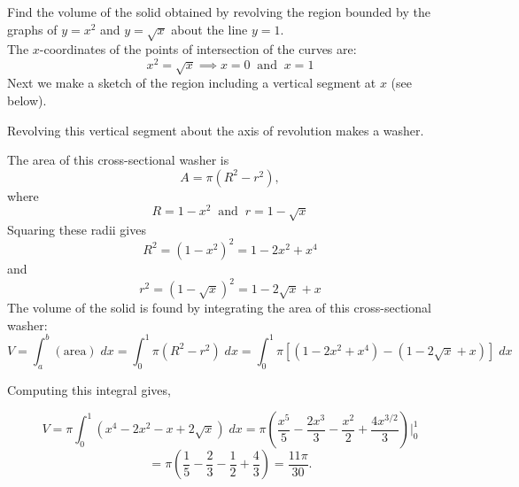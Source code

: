 \documentclass[handout]{ximera}
\begin{document}
\begin{example}[example 6] Find the volume of the solid obtained by revolving the region bounded by the graphs of 
$y = x^2$ and $y = \sqrt x$ about the line $y = 1$.\\
The $x$-coordinates of the points of intersection of the curves are:
\[
x^2 = \sqrt x \implies x = 0 \;\; \text{and} \;\; x=1\]
Next we make a sketch of the region including a vertical segment at $x$ (see below).

Revolving this vertical segment about the axis of revolution makes a washer.

The area of this cross-sectional washer is
\[
A = \pi(R^2 -r^2),
\]
where 
\[
R = 1-x^2 \;\; \text{and} \;\; r = 1 - \sqrt x
\]
Squaring these radii gives
\[
R^2 = (1-x^2)^2 = 1 - 2x^2 + x^4
\]
and
\[
r^2 = (1-\sqrt x)^2 = 1 - 2\sqrt x + x
\]
The volume of the solid is found by integrating the area of this cross-sectional washer:
\[
V = \int_a^b (\text{area}) \; dx = \int_0^1 \pi(R^2 -r^2) \; dx = \int_0^1 \pi [(1-2x^2 + x^4) - (1-2\sqrt x + x)] \; dx
\]

Computing this integral gives,

\[
V = \pi \int_0^1 (x^4 -2x^2 - x + 2\sqrt x) \; dx = \pi \left(\frac{x^5}{5} - \frac{2x^3}{3} - \frac{x^2}{2} + \frac{4x^{3/2}}{3} \right) \bigg|_0^1
\]
\[
= \pi \left(\frac15 -\frac23 - \frac12 + \frac43 \right) = \frac{11\pi}{30}.
\]




\begin{image}
\end{image}
\end{example}
\end{document}
